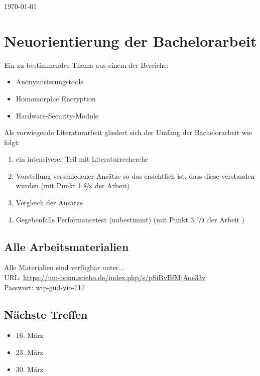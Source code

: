\documentclass[12pt,a4paper]{scrartcl}
\begin{document}
\thispagestyle{empty}

\begin{flushright}
	\today
\end{flushright}

\section*{Neuorientierung der Bachelorarbeit}

Ein zu bestimmendes Thema aus einem der Bereiche:
\begin{itemize}
	\item Anonymisierungstools
	\item Homomorphic Encryption
	\item Hardware-Security-Module
\end{itemize}
Als vorwiegende Literaturarbeit gliedert sich der Umfang der Bachelorarbeit wie folgt:
\begin{enumerate}
	\item ein intensiverer Teil mit Literaturrecherche
	\item Vorstellung verschiedener Ansätze so das ersichtlich ist, dass diese verstanden wurden (mit Punkt 1 $\nicefrac{2}{3}$ der Arbeit)
	\item Vergleich der Ansätze
	\item Gegebenfalls Performancetest (unbestimmt) (mit Punkt 3 $\nicefrac{1}{3}$ der Arbeit )
\end{enumerate}

\subsection*{Alle Arbeitsmaterialien}
Alle Materialien sind verfügbar unter...\\
URL: \url{https://uni-bonn.sciebo.de/index.php/s/pSiBvBfMjAoe33v}\\
Passwort: wip-gud-yio-717


\subsection*{Nächste Treffen}

\begin{itemize}
	\item 16. März
	\item 23. März
	\item 30. März
\end{itemize}
\end{document}
